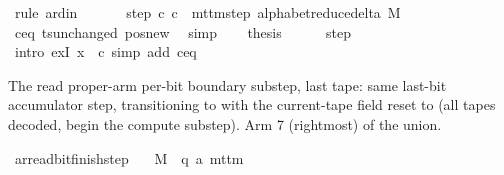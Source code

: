 \begin{isabellebody}
\ {\isacharparenleft}{\kern0pt}rule\ ard{\isacharunderscore}{\kern0pt}in{\isacharparenright}{\kern0pt}\isanewline
\ \ \isamarkupfalse%
\isanewline
\ \ \isamarkupfalse%
\ step{\isacharcolon}{\kern0pt}\ {\isachardoublequoteopen}{\isacharparenleft}{\kern0pt}c{\isacharprime}{\kern0pt}{\isacharcomma}{\kern0pt}\ {\isacharquery}{\kern0pt}c{\isacharprime}{\kern0pt}{\isacharprime}{\kern0pt}{\isacharparenright}{\kern0pt}\ {\isasymin}\ mttm{\isacharunderscore}{\kern0pt}step\ {\isacharparenleft}{\kern0pt}alphabet{\isacharunderscore}{\kern0pt}reduce{\isacharunderscore}{\kern0pt}delta\ M{\isacharparenright}{\kern0pt}{\isachardoublequoteclose}\isanewline
\ \ \ \ \isamarkupfalse%
\ c{\isacharprime}{\kern0pt}{\isacharunderscore}{\kern0pt}eq\ ts{\isacharunderscore}{\kern0pt}unchanged\ pos{\isacharunderscore}{\kern0pt}new\ \isamarkupfalse%
\ simp\isanewline
\ \ \isamarkupfalse%
\ {\isacharquery}{\kern0pt}thesis\isanewline
\ \ \ \ \isamarkupfalse%
\ step\ \isamarkupfalse%
\ {\isacharparenleft}{\kern0pt}intro\ exI{\isacharbrackleft}{\kern0pt}\ x\ {\isacharequal}{\kern0pt}\ {\isacharquery}{\kern0pt}c{\isacharprime}{\kern0pt}{\isacharprime}{\kern0pt}{\isacharbrackright}{\kern0pt}{\isacharparenright}{\kern0pt}\ {\isacharparenleft}{\kern0pt}simp\ add{\isacharcolon}{\kern0pt}\ c{\isacharprime}{\kern0pt}{\isacharunderscore}{\kern0pt}eq{\isacharparenright}{\kern0pt}\isanewline
{}\isamarkupfalse%
%
\endisatagproof
{\isafoldproof}%
%
\isadelimproof
%
\endisadelimproof
%
\begin{isamarkuptext}%
The read proper-arm per-bit boundary substep, last tape: same
  last-bit accumulator step, transitioning to  with
  the current-tape field reset to  (all tapes decoded,
  begin the compute substep).  Arm 7 (rightmost) of the union.%
\end{isamarkuptext}\isamarkuptrue%
\isamarkupfalse%
\ ar{\isacharunderscore}{\kern0pt}read{\isacharunderscore}{\kern0pt}bit{\isacharunderscore}{\kern0pt}finish{\isacharunderscore}{\kern0pt}step{\isacharcolon}{\kern0pt}\isanewline
\ \ \ M\ {\isacharcolon}{\kern0pt}{\isacharcolon}{\kern0pt}\ {\isachardoublequoteopen}{\isacharparenleft}{\kern0pt}{\isacharprime}{\kern0pt}q{\isacharcomma}{\kern0pt}\ {\isacharprime}{\kern0pt}a{\isacharparenright}{\kern0pt}\ mttm{\isachardoublequoteclose}\isanewline

\end{isabellebody}
